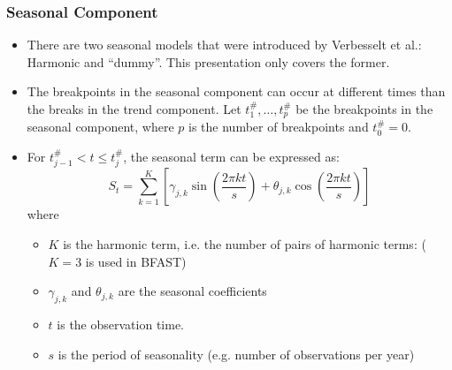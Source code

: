 \documentclass[presentation.tex]{subfiles}
\begin{document}
\begin{frame}
  \frametitle{Seasonal Component}
  \begin{itemize}
  \item 
    There are two seasonal models that were introduced by Verbesselt et al.:
    Harmonic and ``dummy''. This presentation only covers the former.
    \item 
      The breakpoints in the seasonal component can occur at different times than the
      breaks in the trend component. Let
      $t_1^{\#},\hdots, t_p^{\#}$ be the breakpoints in the seasonal component,
      where $p$ is the number of breakpoints and $t_0^{\#} = 0$.
    \item 
      
      For $t_{j-1}^{\#} < t \leq t_j^{\#}$, the seasonal term can be expressed as:
    \[
    S_t =
    \sum_{k=1}^{K}\left[\gamma_{j, k} \sin \left(\frac{2 \pi k t}{s}\right)+
      \theta_{j, k} \cos \left(\frac{2 \pi k t}{s}\right)\right]
    \]
where
\begin{itemize}
\item $K$ is the harmonic term, i.e. the number of pairs of harmonic terms:
  ($K=3$ is used in BFAST)
\item $\gamma_{j, k}$ and $\theta_{j, k}$ are the seasonal coefficients
\item $t$ is the observation time.
\item $s$ is the period of seasonality (e.g. number of observations per year)
\end{itemize}
  \end{itemize}
\end{frame}
\end{document}
